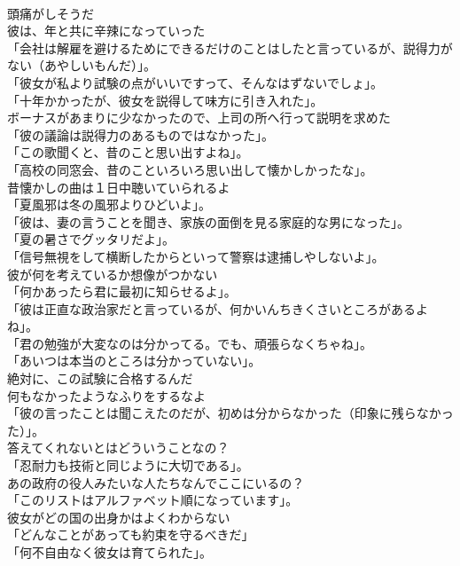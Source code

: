 \documentclass[8pt]{extreport}
\begin{document}
\begin{CJK}{UTF8}{min}
\\	頭痛がしそうだ	
\\	彼は、年と共に辛辣になっていった	
\\	「会社は解雇を避けるためにできるだけのことはしたと言っているが、説得力がない（あやしいもんだ）」。	
\\	「彼女が私より試験の点がいいですって、そんなはずないでしょ」。	
\\	「十年かかったが、彼女を説得して味方に引き入れた」。	
\\	ボーナスがあまりに少なかったので、上司の所へ行って説明を求めた	
\\	「彼の議論は説得力のあるものではなかった」。	
\\	「この歌聞くと、昔のこと思い出すよね」。	
\\	「高校の同窓会、昔のこといろいろ思い出して懐かしかったな」。	
\\	昔懐かしの曲は１日中聴いていられるよ	
\\	「夏風邪は冬の風邪よりひどいよ」。	
\\	「彼は、妻の言うことを聞き、家族の面倒を見る家庭的な男になった」。	
\\	「夏の暑さでグッタリだよ」。	
\\	「信号無視をして横断したからといって警察は逮捕しやしないよ」。	
\\	彼が何を考えているか想像がつかない	
\\	「何かあったら君に最初に知らせるよ」。	
\\	「彼は正直な政治家だと言っているが、何かいんちきくさいところがあるよね」。	
\\	「君の勉強が大変なのは分かってる。でも、頑張らなくちゃね」。	
\\	「あいつは本当のところは分かっていない」。	
\\	絶対に、この試験に合格するんだ	
\\	何もなかったようなふりをするなよ	
\\	「彼の言ったことは聞こえたのだが、初めは分からなかった（印象に残らなかった）」。	
\\	答えてくれないとはどういうことなの？	
\\	「忍耐力も技術と同じように大切である」。	
\\	あの政府の役人みたいな人たちなんでここにいるの？	
\\	「このリストはアルファベット順になっています」。	
\\	彼女がどの国の出身かはよくわからない	
\\	「どんなことがあっても約束を守るべきだ」	
\\	「何不自由なく彼女は育てられた」。	

\end{CJK}
\end{document}
